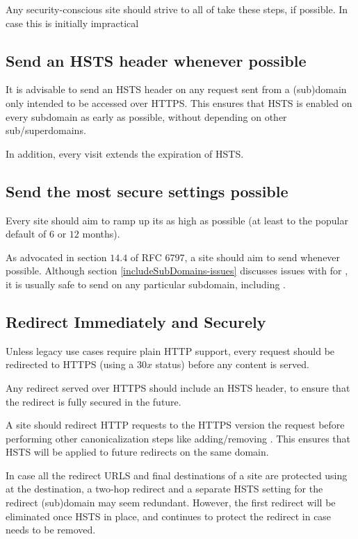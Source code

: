 \documentclass{acm_proc_article-sp}
\begin{document}
{Any security-conscious site should strive to all of take these steps, if possible. In case this is initially impractical

\subsection{Send an HSTS header whenever possible}

It is advisable to send an HSTS header on any request sent from a (sub)domain only intended to be accessed over HTTPS. This ensures that HSTS is enabled on every subdomain as early as possible, without depending on other sub/superdomains.

In addition, every visit extends the expiration of HSTS.

\subsection{Send the most secure settings possible}

Every site should aim to ramp up its  as high as possible (at least to the popular default of $6$ or $12$ months).

As advocated in section $14.4$ of RFC 6797\cite{rfc}, a site should aim to send  whenever possible. Although section \ref{includeSubDomains-issues} discusses issues with {\iSD} for {\s}, it is usually safe to send {\iSD} on any particular subdomain, including {\sw}.

\subsection{Redirect Immediately and Securely}

Unless legacy use cases require plain HTTP support, every request should be redirected to HTTPS (using a $30x$ status) before any content is served.

Any redirect served over HTTPS should include an HSTS header, to ensure that the redirect is fully secured in the future.

A site should redirect HTTP requests to the HTTPS version the request before performing other canonicalization steps like adding/removing . This ensures that HSTS will be applied to future redirects on the same domain.

In case all the redirect URLS and final destinations of a site are protected using {\iSD} at the destination, a two-hop redirect and a separate HSTS setting for the redirect (sub)domain may seem redundant. However, the first redirect will be eliminated once HSTS in place, and continues to protect the redirect in case {\iSD} needs to be removed.

}
\end{document}

